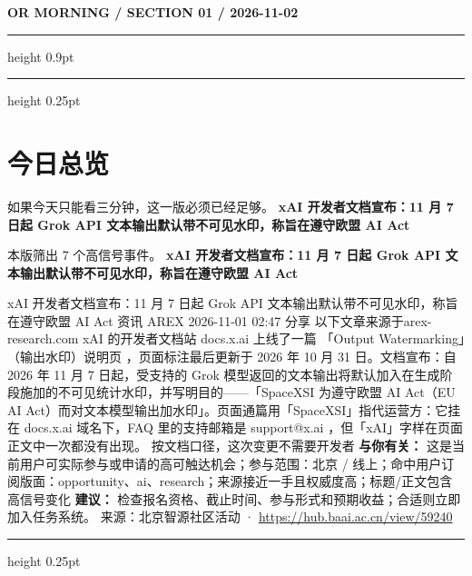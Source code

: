 \documentclass[10.5pt]{ctexart}
\begin{document}
{\small\bfseries OR MORNING / SECTION 01 / 2026-11-02}
\vspace{2mm}
\hrule height 0.9pt
\vspace{1.5mm}
\hrule height 0.25pt
\vspace{4mm}
\section*{今日总览}
{\color{ormuted} 如果今天只能看三分钟，这一版必须已经足够。}
\vspace{2mm}
{\fontsize{25}{29}\selectfont\bfseries xAI 开发者文档宣布：11 月 7 日起 Grok API 文本输出默认带不可见水印，称旨在遵守欧盟 AI Act}\par
\vspace{2mm}
{\large 本版筛出 7 个高信号事件。}
\vspace{3mm}
{\Large\bfseries xAI 开发者文档宣布：11 月 7 日起 Grok API 文本输出默认带不可见水印，称旨在遵守欧盟 AI Act}\par
xAI 开发者文档宣布：11 月 7 日起 Grok API 文本输出默认带不可见水印，称旨在遵守欧盟 AI Act 资讯 AREX 2026-11-01 02:47 分享 以下文章来源于arex-research.com xAI 的开发者文档站 docs.x.ai 上线了一篇 「Output Watermarking」（输出水印）说明页 ，页面标注最后更新于 2026 年 10 月 31 日。文档宣布：自 2026 年 11 月 7 日起，受支持的 Grok 模型返回的文本输出将默认加入在生成阶段施加的不可见统计水印，并写明目的——「SpaceXSI 为遵守欧盟 AI Act（EU AI Act）而对文本模型输出加水印」。页面通篇用「SpaceXSI」指代运营方：它挂在 docs.x.ai 域名下，FAQ 里的支持邮箱是 support@x.ai ，但「xAI」字样在页面正文中一次都没有出现。 按文档口径，这次变更不需要开发者
\textbf{与你有关：} 这是当前用户可实际参与或申请的高可触达机会；参与范围：北京 / 线上；命中用户订阅版面：opportunity、ai、research；来源接近一手且权威度高；标题/正文包含高信号变化
\textbf{建议：} 检查报名资格、截止时间、参与形式和预期收益；合适则立即加入任务系统。
{\footnotesize\color{ormuted} 来源：北京智源社区活动 · \url{https://hub.baai.ac.cn/view/59240}}
\vspace{3mm}
\hrule height 0.25pt
\vspace{3mm}
\end{document}
